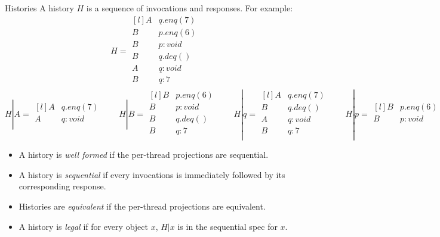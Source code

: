 \begin{definitionbox}{Histories}
	A history $H$ is a sequence of invocations and responses. For example:
	\[H = \begin{matrix*}[l]
			A & q.enq(7) \\
			B & p.enq(6) \\
			B & p : void \\
			B & q.deq() \\
			A & q: void \\
			B & q: 7 \\
		\end{matrix*}\]
	\[H|A = \begin{matrix*}[l]
			A & q.enq(7) \\
			A & q: void \\
		\end{matrix*} \qquad H|B = \begin{matrix*}[l]
			B & p.enq(6) \\
			B & p : void \\
			B & q.deq() \\
			B & q: 7 \\
		\end{matrix*} \qquad
		H|q = \begin{matrix*}[l]
			A & q.enq(7) \\
			B & q.deq() \\
			A & q: void \\
			B & q: 7 \\
		\end{matrix*} \qquad H|p = \begin{matrix*}[l]
			B & p.enq(6) \\
			B & p : void \\
		\end{matrix*}
	\]
	\begin{itemize}
		\item A history is \textit{well formed} if the per-thread projections are sequential.
		\item A history is \textit{sequential} if every invocations is immediately followed by its corresponding response.
		\item Histories are \textit{equivalent} if the per-thread projections are equivalent.
		\item A history is \textit{legal} if for every object $x$, $H|x$ is in the sequential spec for $x$.
	\end{itemize}
\end{definitionbox}


